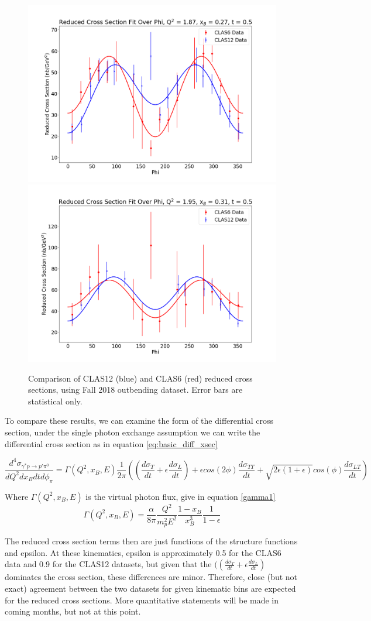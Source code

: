\begin{figure}[hbt]
	\includegraphics[page=133,width=0.3\linewidth]{Chapters/Ch5-Further/basic_cross_sections/pics/ReducedCrossSectionFitOverPhi_Q2187_x_B027_t05.png}
	\includegraphics[page=135,width=0.3\linewidth]{Chapters/Ch5-Further/basic_cross_sections/pics/ReducedCrossSectionFitOverPhi_Q2195_x_B031_t05.png}
	
	\caption{Comparison of CLAS12 (blue) and CLAS6 (red) reduced cross sections, using Fall 2018 outbending dataset. Error bars are statistical only.}
	\label{fig:reduced_xsec_plots}
\end{figure}

To compare these results, we can examine the form of the differential cross section, under the single photon exchange assumption we can write the differential cross section as in equation \ref{eq:basic_diff_xsec}

 \begin{equation}\label{dif1}
     \frac{d^4\sigma_{\gamma^*p \rightarrow p'\pi^0}}{dQ^2dx_Bdtd\phi_{\pi}} =
     \Gamma (Q^2, x_B, E)
     \frac{1}{2\pi}
     ((\frac{d\sigma_T}{dt}+\epsilon\frac{d\sigma_L}{dt})+
     \epsilon cos(2\phi) \frac{d\sigma_{TT}}{dt} + \sqrt{2\epsilon(1+\epsilon)}cos(\phi)\frac{d\sigma_{LT}}{dt})
\end{equation}

Where $\Gamma (Q^2, x_B, E)$ is the virtual photon flux, give in equation \ref{gamma1}
 \begin{equation}\label{gamma1}
            \Gamma (Q^2, x_B, E) = \frac{\alpha}{8\pi} \frac{Q^2}{m^2_pE^2}\frac{1-x_B}{x_B^3}\frac{1}{1-\epsilon}
\end{equation}

The reduced cross section terms then are just functions of the structure functions and epsilon. At these kinematics, epsilon is approximately 0.5 for the CLAS6 data and 0.9 for the CLAS12 datasets, but given that the $((\frac{d\sigma_T}{dt}+\epsilon\frac{d\sigma_L}{dt})$ dominates the cross section, these differences are minor. Therefore, close (but not exact) agreement between the two datasets for given kinematic bins are expected for the reduced cross sections. More quantitative statements will be made in coming months, but not at this point.

